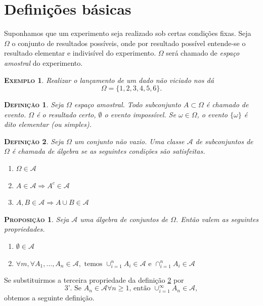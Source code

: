 \documentclass[
	12pt,				%
    oneside,			%
	a4paper,			%
	english,			%
	french,				%
	spanish,			%
	brazil,				%
	]{abntex2}
\newtheorem{propo}[theorem]{\scshape Proposi\c{c}\~ao}
\newtheorem{definicao}{\scshape Defini\c{c}\~ao}[section]
\newtheorem{ex}{\scshape Exemplo}[section]
\begin{document}
    \section{Definições básicas}
        Suponhamos que um experimento seja realizado sob certas condições fixas. Seja $\Omega$ o conjunto de resultados possíveis, onde por resultado possível entende-se o resultado elementar e indivisível do experimento. $\Omega$ será chamado de \textit{espaço amostral} do experimento.
        \begin{ex}
            Realizar o lançamento de um dado não viciado nos dá
            \[\Omega = \{1,2,3,4,5,6\}.\]
        \end{ex}
        \begin{definicao}
            Seja $\Omega$ espaço amostral. Todo subconjunto $A \subset \Omega$ é chamado de evento. $\Omega$ é o resultado certo, $\emptyset$ o evento impossível. Se $\omega \in \Omega$, o evento $\{\omega\}$ é dito elementar (ou simples).
        \end{definicao}
        \begin{definicao}\label{def:alg}
            Seja $\Omega$ um conjunto não vazio. Uma classe $\mathcal{A}$ de subconjuntos de $\Omega$ é chamada de álgebra se as seguintes condições são satisfeitas.
            \begin{enumerate}
                \item $\Omega \in \mathcal{A}$
                \item $A\in\mathcal{A} \Rightarrow A^c \in \mathcal{A}$
                \item $ A,B \in \mathcal{A} \Rightarrow A \cup B \in \mathcal{A}$
            \end{enumerate}
        \end{definicao}

        \begin{propo}
            Seja $\mathcal{A}$ uma álgebra de conjuntos de $\Omega$. Então valem as seguintes propriedades.
            \begin{enumerate}
                \item $\emptyset \in \mathcal{A}$
                \item $\forall m, \forall A_1,\dots,A_n \in \mathcal{A},\text{ temos }\cup_{i=1}^{n}A_i \in \mathcal{A} \text{ e } \cap_{i=1}^{n}A_i \in \mathcal{A}$
            \end{enumerate}
        \end{propo}
        Se substituirmos a terceira propriedade da definição \ref{def:alg} por
        \begin{equation*}
            \text{3'. Se $A_n\in\mathcal{A} \forall n\geq 1$, então $\cup_{i=1}^{\infty}A_n \in \mathcal{A}$},
        \end{equation*}
        obtemos a seguinte definição.
\end{document}
